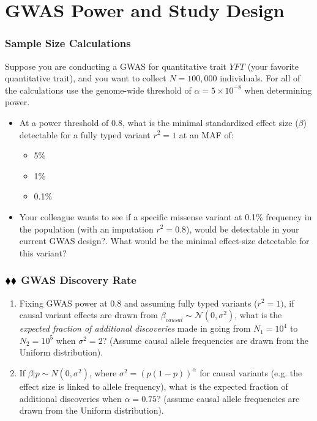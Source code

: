 \documentclass{pset}
\date{7/7/2025}
\begin{document}
\maketitle

\section*{GWAS Power and Study Design}

\subsubsection*{Sample Size Calculations}

Suppose you are conducting a GWAS for quantitative trait $YFT$ (your favorite quantitative trait), and you want to collect $N=100,000$ individuals. For all of the calculations use the genome-wide threshold of $\alpha = 5\times 10^{-8}$ when determining power.

\begin{itemize}
	\item At a power threshold of $0.8$, what is the minimal standardized effect size ($\beta$) detectable for a fully typed variant $r^2 = 1$ at an MAF of: 
	\begin{itemize}
		\item 5\% 
		\item 1\%
		\item 0.1\%
	\end{itemize}
	\item Your colleague wants to see if a specific missense variant at 0.1\% frequency in the population (with an imputation $r^2 = 0.8$), would be detectable in your current GWAS design?. What would be the minimal effect-size detectable for this variant?  
\end{itemize}

\subsubsection*{$\mathbin{\blacklozenge}\mathbin{\blacklozenge}$ GWAS Discovery Rate} 

\begin{enumerate}
\item Fixing GWAS power at $0.8$ and assuming fully typed variants ($r^2 = 1)$, if causal variant effects are drawn from $\beta_{causal} \sim \mathcal{N}(0,\sigma^2)$, what is the \textit{expected fraction of additional discoveries} made in going from $N_1 = 10^4$ to $N_2 = 10^5$ when $\sigma^2 = 2$? (Assume causal allele frequencies are drawn from the Uniform distribution). 
	
\item If $\beta | p \sim N(0, \sigma^2)$, where $\sigma^2 = \left(p(1-p)\right)^{\alpha}$ for causal variants (e.g. the effect size is linked to allele frequency), what is the expected fraction of additional discoveries when $\alpha = 0.75$? (assume causal allele frequencies are drawn from the Uniform distribution).
\end{enumerate}
\end{document}
